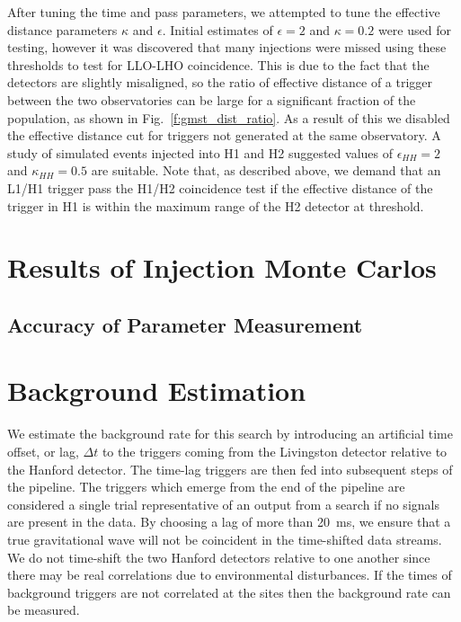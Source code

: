 After tuning the time and pass parameters, we attempted to tune the effective
distance parameters $\kappa$ and $\epsilon$. Initial estimates of $\epsilon =
2$ and $\kappa = 0.2$ were used for testing, however it was discovered that
many injections were missed using these thresholds to test for LLO-LHO
coincidence. This is due to the fact that the detectors are slightly
misaligned, so the ratio of effective distance of a trigger between the two
observatories can be large for a significant fraction of the population, as
shown in Fig.~\ref{f:gmst_dist_ratio}. As a result of this we disabled the
effective distance cut for triggers not generated at the same observatory.
A study of simulated events injected into H1 and H2 suggested values
of $\epsilon_{HH} = 2$ and $\kappa_{HH} = 0.5$ are suitable. Note
that, as described above, we demand that an
L1/H1 trigger pass the H1/H2 coincidence test if the effective distance of the
trigger in H1 is within the maximum range of the H2 detector at threshold.

\section{Results of Injection Monte Carlos}
\label{s:monte}

\subsection{Accuracy of Parameter Measurement}
\label{ss:s2parameters}

\section{Background Estimation}
\label{s:s2background}

We estimate the background rate for this search by introducing an artificial
time offset, or {lag}, $\Delta t$ to the triggers coming from the Livingston
detector relative to the Hanford detector.  The time-lag triggers are then fed
into subsequent steps of the pipeline.  The triggers which emerge from the end
of the pipeline are considered a single trial representative of an output from
a search if no signals are present in the data.   By choosing a lag of more
than 20~ms, we ensure that a true gravitational wave will not be coincident in
the time-shifted data streams.  We do not time-shift the two Hanford detectors
relative to one another since there may be real correlations due to
environmental disturbances.  If the times of background triggers are not
correlated at the sites then the background rate can be measured.

